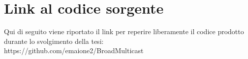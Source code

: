 
\chapter{Link al codice sorgente}
\label{ref:appA}

Qui di seguito viene riportato il link per reperire liberamente il codice prodotto durante lo svolgimento della tesi:\\


https://github.com/emaione2/BroadMulticast